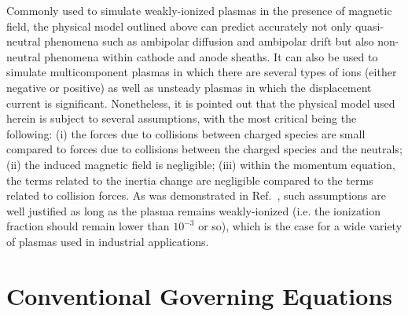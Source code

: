 \documentclass{warpdoc}
\begin{document}
Commonly used to simulate weakly-ionized plasmas in the presence of magnetic field, the physical model outlined above can predict accurately not only quasi-neutral phenomena such as ambipolar diffusion and ambipolar drift but also non-neutral phenomena within cathode and anode sheaths. It can also be used to simulate multicomponent plasmas in which there are several types of ions (either negative or positive) as well as unsteady plasmas in which the displacement current is significant. Nonetheless, it is pointed out that the physical model used herein is subject to several assumptions, with the most critical being the following: (i) the forces due to collisions between charged species are small compared to forces due to collisions  between the charged species and the neutrals; (ii) the induced magnetic field is negligible; (iii) within the momentum equation, the terms related to the inertia change are negligible compared to the terms related to collision forces. As was demonstrated in Ref.\ \cite{jcp:2011:parent}, such assumptions are well justified as long as the plasma remains weakly-ionized (i.e. the ionization fraction should remain lower than $10^{-3}$ or so), which is the case for a wide variety of plasmas used in industrial applications.     



\section{Conventional Governing Equations}
\end{document}
